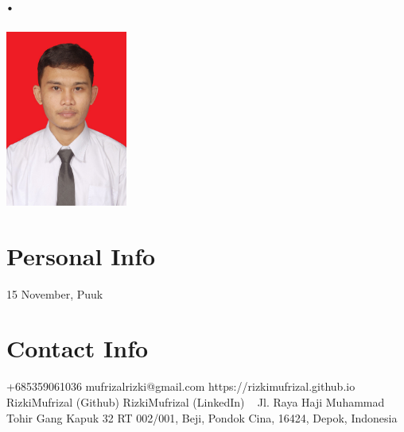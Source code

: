 \documentclass[english]{cv-style}
\begin{document}

\begin{aside}
\section{.}
\includegraphics[width=4cm]{foto}
%
\section{Personal Info}
15 November, Puuk
%
\section{Contact Info}
+685359061036
mufrizalrizki@gmail.com
https://rizkimufrizal.github.io
RizkiMufrizal (Github)
RizkiMufrizal (LinkedIn)
~
Jl. Raya Haji Muhammad Tohir Gang Kapuk 32 RT 002/001, Beji, Pondok Cina, 16424, Depok, Indonesia
%
\end{aside}
\end{document}
